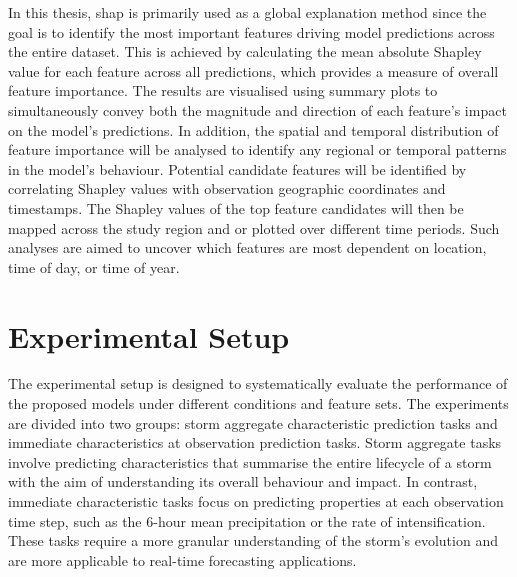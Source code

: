 In this thesis, \acrshort{shap} is primarily used as a global explanation method since the goal is to identify the most important features driving model predictions across the entire dataset. This is achieved by calculating the mean absolute Shapley value for each feature across all predictions, which provides a measure of overall feature importance. The results are visualised using summary plots to simultaneously convey both the magnitude and direction of each feature's impact on the model's predictions. In addition, the spatial and temporal distribution of feature importance will be analysed to identify any regional or temporal patterns in the model's behaviour. Potential candidate features will be identified by correlating Shapley values with observation geographic coordinates and timestamps. The Shapley values of the top feature candidates will then be mapped across the study region and or plotted over different time periods. Such analyses are aimed to uncover which features are most dependent on location, time of day, or time of year.

\section{Experimental Setup}

The experimental setup is designed to systematically evaluate the performance of the proposed models under different conditions and feature sets. The experiments are divided into two groups: storm aggregate characteristic prediction tasks and immediate characteristics at observation prediction tasks. Storm aggregate tasks involve predicting characteristics that summarise the entire lifecycle of a storm with the aim of understanding its overall behaviour and impact. In contrast, immediate characteristic tasks focus on predicting properties at each observation time step, such as the 6-hour mean precipitation or the rate of intensification. These tasks require a more granular understanding of the storm's evolution and are more applicable to real-time forecasting applications.

